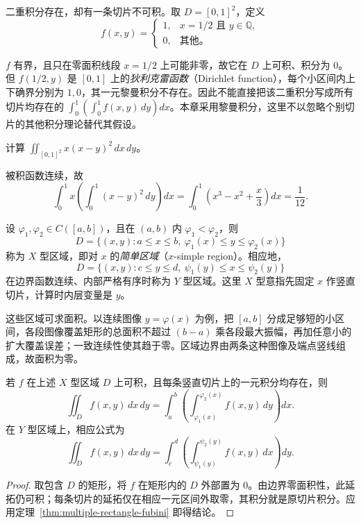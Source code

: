 \documentclass[UTF8,12pt,a4paper,fontset=fandol]{ctexbook}
\begin{document}
\begin{example}
\label{ex:multiple-integrable-bad-slices}
二重积分存在，却有一条切片不可积。取 $D=[0,1]^2$，定义
\[
    f(x,y)=\begin{cases}1,&x=1/2\text{ 且 }y\in\mathbb Q,\\0,&\text{其他}。\end{cases}
\]
\end{example}
\begin{solve}
$f$ 有界，且只在零面积线段 $x=1/2$ 上可能非零，故它在 $D$ 上可积、积分为 $0$。但 $f(1/2,y)$ 是 $[0,1]$ 上的\emph{狄利克雷函数}（Dirichlet function），每个小区间内上下确界分别为 $1,0$，其一元黎曼积分不存在。因此不能直接把该二重积分写成所有切片均存在的 $\int_0^1(\int_0^1f(x,y)\,dy)dx$。本章采用黎曼积分，这里不以忽略个别切片的其他积分理论替代其假设。
\end{solve}

\begin{example}
\label{ex:multiple-square-polynomial}
计算 $\iint_{[0,1]^2}x(x-y)^2\,dx\,dy$。
\end{example}
\begin{solve}
被积函数连续，故
\[
    \int_0^1x\left(\int_0^1(x-y)^2\,dy\right)dx
    =\int_0^1\left(x^3-x^2+\frac{x}{3}\right)dx
    =\frac1{12}.
\]
\end{solve}

\begin{definition}
\label{def:multiple-normal-domains}
设 $\varphi_1,\varphi_2\in C([a,b])$，且在 $(a,b)$ 内 $\varphi_1<\varphi_2$，则
\[
    D=\{(x,y):a\leq x\leq b,\ \varphi_1(x)\leq y\leq\varphi_2(x)\}
\]
称为 $X$ 型区域，即对 $x$ 的\emph{简单区域}（$x$-simple region）。相应地，
\[
    D=\{(x,y):c\leq y\leq d,\ \psi_1(y)\leq x\leq\psi_2(y)\}
\]
在边界函数连续、内部严格有序时称为 $Y$ 型区域。这里 $X$ 型意指先固定 $x$ 作竖直切片，计算时内层变量是 $y$。
\end{definition}

这些区域可求面积。以连续图像 $y=\varphi(x)$ 为例，把 $[a,b]$ 分成足够短的小区间，各段图像覆盖矩形的总面积不超过 $(b-a)$ 乘各段最大振幅，再加任意小的扩大覆盖误差；一致连续性使其趋于零。区域边界由两条这种图像及端点竖线组成，故面积为零。

\begin{theorem}
\label{thm:multiple-normal-domain-fubini}
若 $f$ 在上述 $X$ 型区域 $D$ 上可积，且每条竖直切片上的一元积分均存在，则
\begin{equation}
    \iint_Df(x,y)\,dx\,dy
    =\int_a^b\left(\int_{\varphi_1(x)}^{\varphi_2(x)}f(x,y)\,dy\right)dx.
    \label{eq:multiple-x-simple-integral}
\end{equation}
在 $Y$ 型区域上，相应公式为
\begin{equation}
    \iint_Df(x,y)\,dx\,dy
    =\int_c^d\left(\int_{\psi_1(y)}^{\psi_2(y)}f(x,y)\,dx\right)dy.
    \label{eq:multiple-y-simple-integral}
\end{equation}
\end{theorem}
\begin{proof}
取包含 $D$ 的矩形，将 $f$ 在矩形内的 $D$ 外部置为 $0$。由边界零面积性，此延拓仍可积；每条切片的延拓仅在相应一元区间外取零，其积分就是原切片积分。应用定理~\ref{thm:multiple-rectangle-fubini} 即得结论。
\end{proof}
\end{document}

